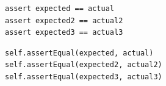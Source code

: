 \documentclass[11pt]{jreport}
\begin{document}
\begin{minipage}[b]{0.40\textwidth}
\begin{lstlisting}[caption=修正前ソースコード, label=sp_src]
assert expected == actual
assert expected2 == actual2
assert expected3 == actual3
\end{lstlisting}
\end{minipage}
\begin{minipage}[b]{0.50\textwidth}
\begin{lstlisting}[caption=修正後ソースコード, label=sp_dest]
self.assertEqual(expected, actual)
self.assertEqual(expected2, actual2)
self.assertEqual(expected3, actual3)
\end{lstlisting}
\end{minipage}



\end{document}
